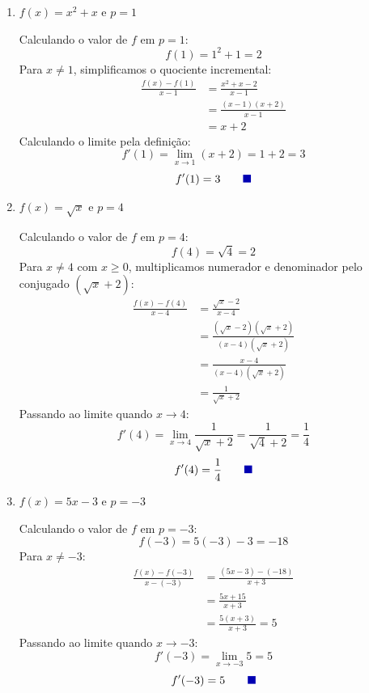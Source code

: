 \documentclass[12pt,a4paper]{article}
\newcommand{\qedsymbolmath}{\tag*{\textcolor{blue!70!black}{\rule{1.6ex}{1.6ex}}}}
\begin{document}
\begin{enumerate}[label=\alph*)]
    \item $f(x) = x^2 + x$ e $p = 1$

    Calculando o valor de $f$ em $p = 1$:
    \[
    f(1) = 1^2 + 1 = 2
    \]
    Para $x \neq 1$, simplificamos o quociente incremental:
    \begin{align*}
        \frac{f(x) - f(1)}{x - 1} &= \frac{x^2 + x - 2}{x - 1} \\[0.25cm]
        &= \frac{(x - 1)(x + 2)}{x - 1} \\[0.25cm]
        &= x + 2
    \end{align*}
    Calculando o limite pela definição:
    \[
    f'(1) = \lim_{x \to 1} (x + 2) = 1 + 2 = 3
    \]
    \begin{equation*}
        f'(1) = 3 \qedsymbolmath
    \end{equation*}

    \item $f(x) = \sqrt{x}$ e $p = 4$

    Calculando o valor de $f$ em $p = 4$:
    \[
    f(4) = \sqrt{4} = 2
    \]
    Para $x \neq 4$ com $x \ge 0$, multiplicamos numerador e denominador pelo conjugado $(\sqrt{x} + 2)$:
    \begin{align*}
        \frac{f(x) - f(4)}{x - 4} &= \frac{\sqrt{x} - 2}{x - 4} \\[0.25cm]
        &= \frac{(\sqrt{x} - 2)(\sqrt{x} + 2)}{(x - 4)(\sqrt{x} + 2)} \\[0.25cm]
        &= \frac{x - 4}{(x - 4)(\sqrt{x} + 2)} \\[0.25cm]
        &= \frac{1}{\sqrt{x} + 2}
    \end{align*}
    Passando ao limite quando $x \to 4$:
    \[
    f'(4) = \lim_{x \to 4} \frac{1}{\sqrt{x} + 2} = \frac{1}{\sqrt{4} + 2} = \frac{1}{4}
    \]
    \begin{equation*}
        f'(4) = \frac{1}{4} \qedsymbolmath
    \end{equation*}

    \item $f(x) = 5x - 3$ e $p = -3$

    Calculando o valor de $f$ em $p = -3$:
    \[
    f(-3) = 5(-3) - 3 = -18
    \]
    Para $x \neq -3$:
    \begin{align*}
        \frac{f(x) - f(-3)}{x - (-3)} &= \frac{(5x - 3) - (-18)}{x + 3} \\[0.25cm]
        &= \frac{5x + 15}{x + 3} \\[0.25cm]
        &= \frac{5(x + 3)}{x + 3} = 5
    \end{align*}
    Passando ao limite quando $x \to -3$:
    \[
    f'(-3) = \lim_{x \to -3} 5 = 5
    \]
    \begin{equation*}
        f'(-3) = 5 \qedsymbolmath
    \end{equation*}


\end{enumerate}
\end{document}
